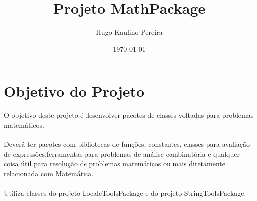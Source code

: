 \documentclass[a4paper,12pt,openany]{book}
\begin{document}
\author{Hugo Kaulino Pereira}
\title{Projeto MathPackage}
\date{\today}


\maketitle

\renewcommand{\contentsname}{Índice}
\tableofcontents

\newpage

\chapter*{Objetivo do Projeto}

O objetivo deste projeto é desenvolver pacotes de classes voltadas para problemas matemáticos.
\\
\\
Deverá ter pacotes com bibliotecas de funções, constantes, classes para avaliação de expressões,ferramentas para problemas de análise combinatória e qualquer coisa útil para resolução de problemas matemáticos ou mais diretamente relacionada com Matemática.
\\
\\
Utiliza classes do projeto LocaleToolsPackage e do projeto StringToolsPackage.

\newpage

 
\end{document}
